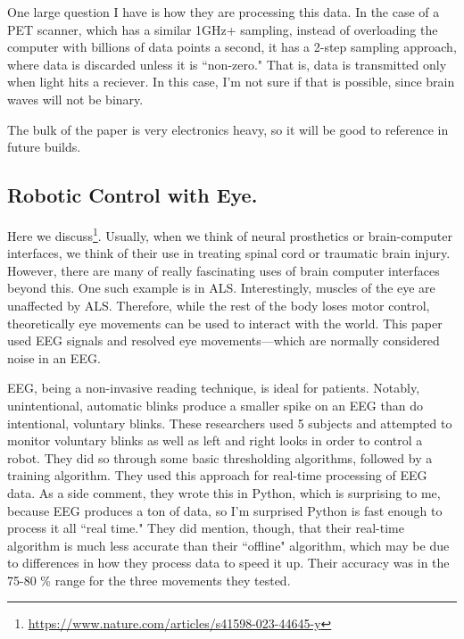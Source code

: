 One large question I have is how they are processing this data. In the case of a PET scanner, which has a similar 1GHz+ sampling, instead of overloading the computer with billions of data points a second, it has a 2-step sampling approach, where data is discarded unless it is ``non-zero." That is, data is transmitted only when light hits a reciever. In this case, I'm not sure if that is possible, since brain waves will not be binary.\newline

The bulk of the paper is very electronics heavy, so it will be good to reference in future builds. 


\subsection{Robotic Control with Eye.}

Here we discuss\footnote{\url{https://www.nature.com/articles/s41598-023-44645-y}}. Usually, when we think of neural prosthetics or brain-computer interfaces, we think of their use in treating spinal cord or traumatic brain injury. However, there are many of really fascinating uses of brain computer interfaces beyond this. One such example is in ALS. Interestingly, muscles of the eye are unaffected by ALS. Therefore, while the rest of the body loses motor control, theoretically eye movements can be used to interact with the world. This paper used EEG signals and resolved eye movements---which are normally considered noise in an EEG.\newline

EEG, being a non-invasive reading technique, is ideal for patients. Notably, unintentional, automatic blinks produce a smaller spike on an EEG than do intentional, voluntary blinks. These researchers used 5 subjects and attempted to monitor voluntary blinks as well as left and right looks in order to control a robot. They did so through some basic thresholding algorithms, followed by a training algorithm. They used this approach for real-time processing of EEG data. As a side comment, they wrote this in Python, which is surprising to me, because EEG produces a ton of data, so I'm surprised Python is fast enough to process it all ``real time." They did mention, though, that their real-time algorithm is much less accurate than their ``offline" algorithm, which may be due to differences in how they process data to speed it up. Their accuracy was in the 75-80 \% range for the three movements they tested.\newline

